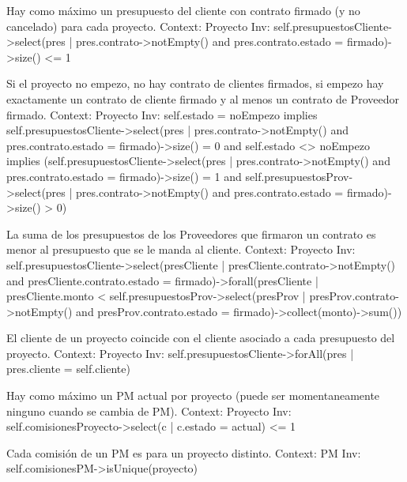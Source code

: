 \begin{listocl}
\begin{itemocl}{Hay como máximo un presupuesto del cliente con contrato firmado (y no cancelado) para cada proyecto.}
Context: Proyecto
Inv: self.presupuestosCliente->select(pres | pres.contrato->notEmpty() and pres.contrato.estado = firmado)->size() <= 1
\end{itemocl}

\begin{itemocl}{Si el proyecto no empezo, no hay contrato de clientes firmados, si empezo hay exactamente un contrato de cliente firmado y al menos un contrato de Proveedor firmado.}
Context: Proyecto
Inv: self.estado = noEmpezo implies self.presupuestosCliente->select(pres | pres.contrato->notEmpty() and pres.contrato.estado = firmado)->size() = 0 and self.estado <> noEmpezo implies (self.presupuestosCliente->select(pres | pres.contrato->notEmpty() and pres.contrato.estado = firmado)->size() = 1 and self.presupuestosProv->select(pres | pres.contrato->notEmpty() and pres.contrato.estado = firmado)->size() > 0)
\end{itemocl}

\begin{itemocl}{La suma de los presupuestos de los Proveedores que firmaron un contrato es menor al presupuesto que se le manda al cliente.}
Context: Proyecto
Inv: self.presupuestosCliente->select(presCliente | presCliente.contrato->notEmpty() and presCliente.contrato.estado = firmado)->forall(presCliente | presCliente.monto < self.presupuestosProv->select(presProv | presProv.contrato->notEmpty() and presProv.contrato.estado = firmado)->collect(monto)->sum())
\end{itemocl}

\begin{itemocl}{El cliente de un proyecto coincide con el cliente asociado a cada presupuesto del proyecto.}
Context: Proyecto
Inv: self.presupuestosCliente->forAll(pres | pres.cliente = self.cliente)
\end{itemocl}

\begin{itemocl}{Hay como máximo un PM actual por proyecto (puede ser momentaneamente ninguno cuando se cambia de PM).}
Context: Proyecto
Inv: self.comisionesProyecto->select(c | c.estado = actual) <= 1
\end{itemocl}

\begin{itemocl}{Cada comisión de un PM es para un proyecto distinto.}
Context: PM
Inv: self.comisionesPM->isUnique(proyecto)
\end{itemocl}


\end{listocl}
